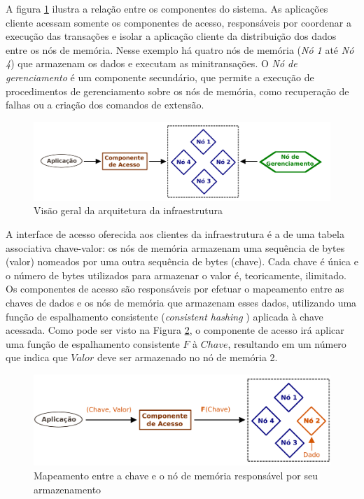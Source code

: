 \documentclass[11pt,twoside,a4paper]{book}
\begin{document}
A figura \ref{fig:overview_arquitetura} ilustra a relação entre os componentes do sistema. As aplicações cliente acessam somente os componentes de acesso, responsáveis por coordenar a execução das transações e isolar a aplicação cliente da distribuição dos dados entre os nós de memória. Nesse exemplo há quatro nós de memória (\emph{Nó 1} até \emph{Nó 4}) que armazenam os dados e executam as minitransações. O \emph{Nó de gerenciamento} é um componente secundário, que permite a execução de procedimentos de gerenciamento sobre os nós de memória, como recuperação de falhas ou a criação dos comandos de extensão.

\begin{figure}
  \centering
  \includegraphics[width=.90\textwidth]{overview_arquitetura} 
  \caption{Visão geral da arquitetura da infraestrutura}
  \label{fig:overview_arquitetura} 
\end{figure}

A interface de acesso oferecida aos clientes da infraestrutura é a de uma tabela associativa chave-valor: os nós de memória armazenam uma sequência de bytes (valor) nomeados por uma outra sequência de bytes (chave). Cada chave é única e o número de bytes utilizados para armazenar o valor é, teoricamente, ilimitado. Os componentes de acesso são responsáveis por efetuar o mapeamento entre as chaves de dados e os nós de memória que armazenam esses dados, utilizando uma função de espalhamento consistente (\emph{consistent hashing} \cite{consistent_hashing}) aplicada à chave acessada. Como pode ser visto na Figura \ref{fig:funcao_espalhamento}, o componente de acesso irá aplicar uma função de espalhamento consistente \textbf{$F$} à $Chave$, resultando em um número que indica que $Valor$ deve ser armazenado no nó de memória 2. 

\begin{figure}
  \centering
  \includegraphics[width=.80\textwidth]{funcao_espalhamento} 
  \caption{Mapeamento entre a chave e o nó de memória responsável por seu armazenamento}
  \label{fig:funcao_espalhamento} 
\end{figure}
\end{document}
